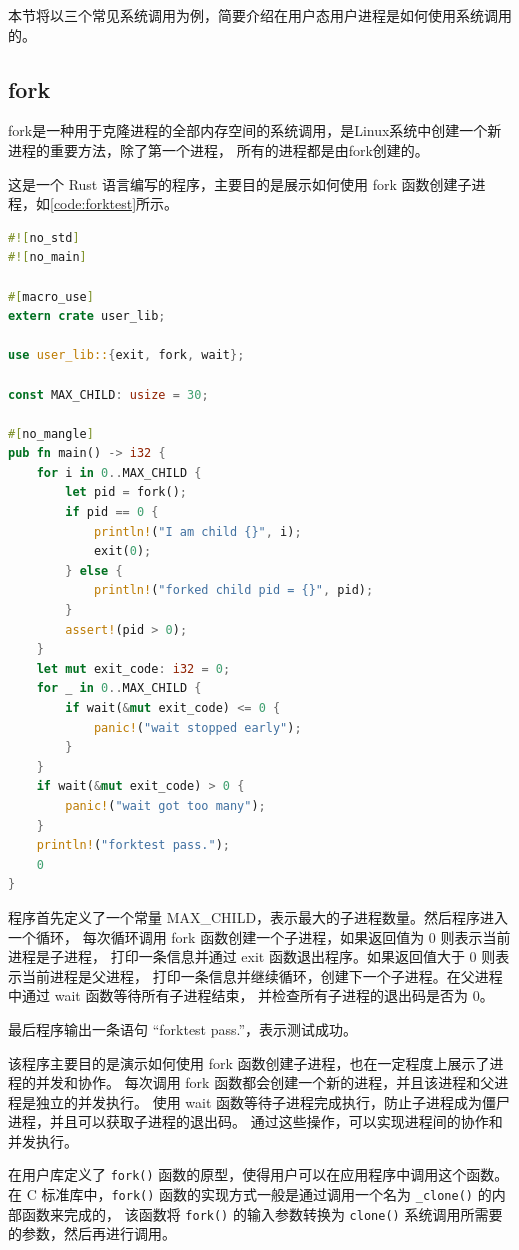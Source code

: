 本节将以三个常见系统调用为例，简要介绍在用户态用户进程是如何使用系统调用的。

\subsection{fork}

fork是一种用于克隆进程的全部内存空间的系统调用，是Linux系统中创建一个新进程的重要方法，除了第一个进程，
所有的进程都是由fork创建的。

这是一个 Rust 语言编写的程序，主要目的是展示如何使用 fork 函数创建子进程，如\autoref{code:forktest}所示。

\begin{lstlisting}[language={Rust}, label={code:forktest},
    caption={forktest.rs}]
#![no_std]
#![no_main]

#[macro_use]
extern crate user_lib;

use user_lib::{exit, fork, wait};

const MAX_CHILD: usize = 30;

#[no_mangle]
pub fn main() -> i32 {
    for i in 0..MAX_CHILD {
        let pid = fork();
        if pid == 0 {
            println!("I am child {}", i);
            exit(0);
        } else {
            println!("forked child pid = {}", pid);
        }
        assert!(pid > 0);
    }
    let mut exit_code: i32 = 0;
    for _ in 0..MAX_CHILD {
        if wait(&mut exit_code) <= 0 {
            panic!("wait stopped early");
        }
    }
    if wait(&mut exit_code) > 0 {
        panic!("wait got too many");
    }
    println!("forktest pass.");
    0
}
\end{lstlisting}

程序首先定义了一个常量 MAX\_CHILD，表示最大的子进程数量。然后程序进入一个循环，
每次循环调用 fork 函数创建一个子进程，如果返回值为 0 则表示当前进程是子进程，
打印一条信息并通过 exit 函数退出程序。如果返回值大于 0 则表示当前进程是父进程，
打印一条信息并继续循环，创建下一个子进程。在父进程中通过 wait 函数等待所有子进程结束，
并检查所有子进程的退出码是否为 0。

最后程序输出一条语句 “forktest pass.”，表示测试成功。

该程序主要目的是演示如何使用 fork 函数创建子进程，也在一定程度上展示了进程的并发和协作。
每次调用 fork 函数都会创建一个新的进程，并且该进程和父进程是独立的并发执行。
使用 wait 函数等待子进程完成执行，防止子进程成为僵尸进程，并且可以获取子进程的退出码。
通过这些操作，可以实现进程间的协作和并发执行。

在用户库定义了 \lstinline`fork()` 函数的原型，使得用户可以在应用程序中调用这个函数。
在 C 标准库中，\lstinline`fork()` 函数的实现方式一般是通过调用一个名为 \lstinline`_clone()` 的内部函数来完成的，
该函数将 \lstinline`fork()` 的输入参数转换为 \lstinline`clone()` 系统调用所需要的参数，然后再进行调用。

